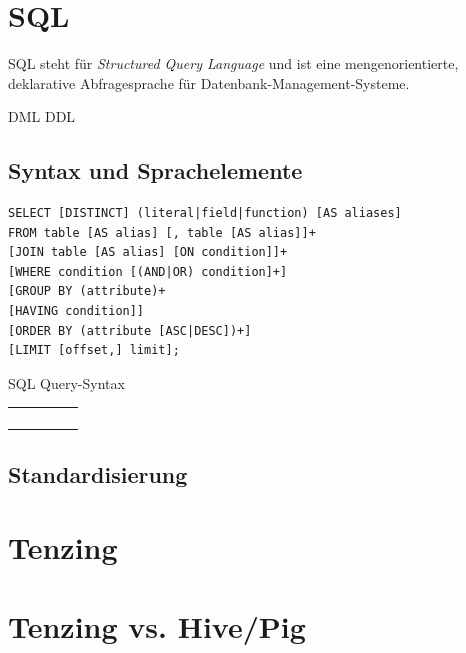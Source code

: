 \documentclass[a4paper]{article}
\begin{document}
\newpage

\section{SQL}
SQL steht für \textit{Structured Query Language} und ist eine mengenorientierte, deklarative Abfragesprache für Datenbank-Management-Systeme.

DML
DDL

\subsection{Syntax und Sprachelemente}

\begin{listing}[H]
\begin{verbatim}
SELECT [DISTINCT] (literal|field|function) [AS aliases]
FROM table [AS alias] [, table [AS alias]]+
[JOIN table [AS alias] [ON condition]]+
[WHERE condition [(AND|OR) condition]+]
[GROUP BY (attribute)+
[HAVING condition]]
[ORDER BY (attribute [ASC|DESC])+]
[LIMIT [offset,] limit];
\end{verbatim}
\caption{SQL Query-Syntax}
\label{sql-syntax}
\end{listing}

\begin{center}
  \begin{tabular}{| c | c | c | c | c |}
    \hline
     & &  & &\\ \hline
     & &  & &\\ \hline
     & &  & &\\ \hline
     & &  & &\\ \hline
     & &  & &\\ \hline
  \end{tabular}
\end{center}

\subsection*{Standardisierung}

\newpage

\section{Tenzing}

\newpage

\section{Tenzing vs. Hive/Pig}

\newpage

\nocite{GFS}
\nocite{GOOGLE-TENZING}
\nocite{GOOGLE-MAPREDUCE}
\nocite{GOOGLE-GFS}
\printbibliography

\listoffigures

\renewcommand\listoflistingscaption{Quellcodeverzeichnis}
\listoflistings
\end{document}
